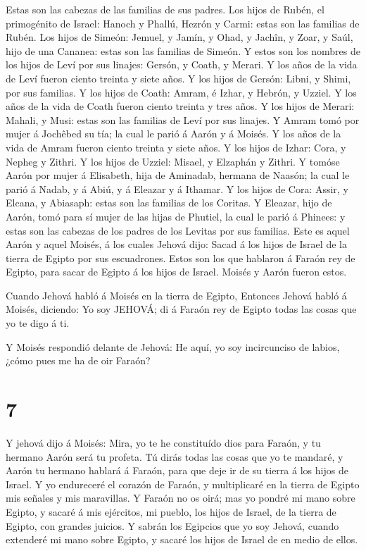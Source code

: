  Estas son las cabezas de las familias de sus padres. Los
hijos de Rubén, el primogénito de Israel: Hanoch y Phallú, Hezrón y
Carmi: estas son las familias de Rubén.  Los hijos de
Simeón: Jemuel, y Jamín, y Ohad, y Jachîn, y Zoar, y Saúl, hijo de una
Cananea: estas son las familias de Simeón.  Y estos son los
nombres de los hijos de Leví por sus linajes: Gersón, y Coath, y Merari.
Y los años de la vida de Leví fueron ciento treinta y siete años.
 Y los hijos de Gersón: Libni, y Shimi, por sus familias.
 Y los hijos de Coath: Amram, é Izhar, y Hebrón, y Uzziel.
Y los años de la vida de Coath fueron ciento treinta y tres años.
 Y los hijos de Merari: Mahali, y Musi: estas son las
familias de Leví por sus linajes.  Y Amram tomó por mujer á
Jochêbed su tía; la cual le parió á Aarón y á Moisés. Y los años de la
vida de Amram fueron ciento treinta y siete años.  Y los
hijos de Izhar: Cora, y Nepheg y Zithri.  Y los hijos de
Uzziel: Misael, y Elzaphán y Zithri.  Y tomóse Aarón por
mujer á Elisabeth, hija de Aminadab, hermana de Naasón; la cual le parió
á Nadab, y á Abiú, y á Eleazar y á Ithamar.  Y los hijos de
Cora: Assir, y Elcana, y Abiasaph: estas son las familias de los
Coritas.  Y Eleazar, hijo de Aarón, tomó para sí mujer de
las hijas de Phutiel, la cual le parió á Phinees: y estas son las
cabezas de los padres de los Levitas por sus familias. 
Este es aquel Aarón y aquel Moisés, á los cuales Jehová dijo: Sacad á
los hijos de Israel de la tierra de Egipto por sus escuadrones.
 Estos son los que hablaron á Faraón rey de Egipto, para
sacar de Egipto á los hijos de Israel. Moisés y Aarón fueron estos.

 Cuando Jehová habló á Moisés en la tierra de Egipto,
 Entonces Jehová habló á Moisés, diciendo: Yo soy JEHOVÁ;
di á Faraón rey de Egipto todas las cosas que yo te digo á ti.

 Y Moisés respondió delante de Jehová: He aquí, yo soy
incircunciso de labios, ¿cómo pues me ha de oir Faraón?

\hypertarget{section-6}{%
\section{7}\label{section-6}}

 Y jehová dijo á Moisés: Mira, yo te he constituído dios
para Faraón, y tu hermano Aarón será tu profeta.  Tú dirás
todas las cosas que yo te mandaré, y Aarón tu hermano hablará á Faraón,
para que deje ir de su tierra á los hijos de Israel.  Y yo
endureceré el corazón de Faraón, y multiplicaré en la tierra de Egipto
mis señales y mis maravillas.  Y Faraón no os oirá; mas yo
pondré mi mano sobre Egipto, y sacaré á mis ejércitos, mi pueblo, los
hijos de Israel, de la tierra de Egipto, con grandes juicios.
 Y sabrán los Egipcios que yo soy Jehová, cuando extenderé
mi mano sobre Egipto, y sacaré los hijos de Israel de en medio de ellos.

